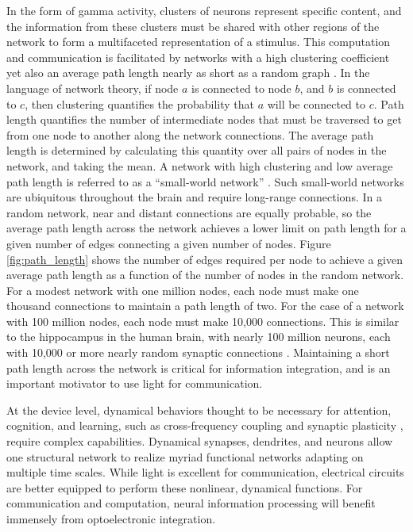 \documentclass[twocolumn]{article}
\begin{document}
In the form of gamma activity, clusters of neurons represent specific content, and the information from these clusters must be shared with other regions of the network to form a multifaceted representation of a stimulus. This computation and communication is facilitated by networks with a high clustering coefficient yet also an average path length nearly as short as a random graph \cite{eskn2015}. In the language of network theory, if node $a$ is connected to node $b$, and $b$ is connected to $c$, then clustering quantifies the probability that $a$ will be connected to $c$. Path length quantifies the number of intermediate nodes that must be traversed to get from one node to another along the network connections. The average path length is determined by calculating this quantity over all pairs of nodes in the network, and taking the mean. A network with high clustering and low average path length is referred to as a ``small-world network'' \cite{wast1998}. Such small-world networks are ubiquitous throughout the brain \cite{sp2010} and require long-range connections. In a random network, near and distant connections are equally probable, so the average path length across the network achieves a lower limit on path length for a given number of edges connecting a given number of nodes. Figure \ref{fig:path_length} shows the number of edges required per node to achieve a given average path length as a function of the number of nodes in the random network. For a modest network with one million nodes, each node must make one thousand connections to maintain a path length of two. For the case of a network with 100 million nodes, each node must make 10,000 connections. This is similar to the hippocampus in the human brain, with nearly 100 million neurons, each with 10,000 or more nearly random synaptic connections \cite{bu2006}. Maintaining a short path length across the network is critical for information integration, and is an important motivator to use light for communication.

At the device level, dynamical behaviors thought to be necessary for attention, cognition, and learning, such as cross-frequency coupling \cite{bu2006} and synaptic plasticity \cite{mage2012,ab2008,fudr2005}, require complex capabilities. Dynamical synapses, dendrites, and neurons allow one structural network to realize myriad functional networks adapting on multiple time scales. While light is excellent for communication, electrical circuits are better equipped to perform these nonlinear, dynamical functions. For communication and computation, neural information processing will benefit immensely from optoelectronic integration.
\end{document}
